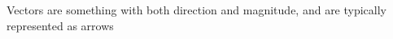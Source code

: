 \documentclass[preview]{standalone}
\begin{document}
\begin{minipage}
{8cm}Vectors are something with both direction and magnitude, and are typically represented as arrows
\end{minipage}
\end{document}
